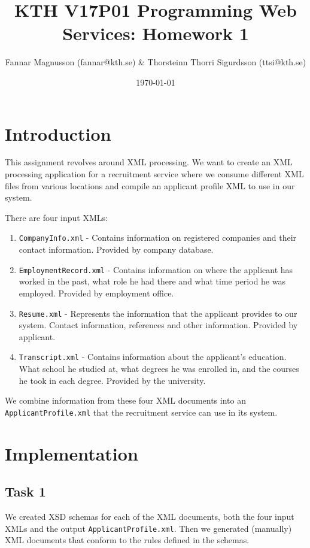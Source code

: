 \documentclass[a4paper, 11pt]{article}
\title{KTH V17P01 Programming Web Services: Homework 1}
\author{Fannar Magnusson (fannar@kth.se) & Thorsteinn Thorri Sigurdsson (ttsi@kth.se)}
\date{\today{}}
\begin{document}
\maketitle

\section{Introduction}

This assignment revolves around XML processing. We want to create an XML processing application for a recruitment service where we consume different XML files from various locations and compile an applicant profile XML to use in our system. 

There are four input XMLs:

\begin{enumerate}
    \item \texttt{CompanyInfo.xml} - Contains information on registered companies and their contact information. Provided by company database.
    \item \texttt{EmploymentRecord.xml} - Contains information on where the applicant has worked in the past, what role he had there and what time period he was employed. Provided by employment office.
    \item \texttt{Resume.xml} - Represents the information that the applicant provides to our system. Contact information, references and other information. Provided by applicant.
    \item \texttt{Transcript.xml} - Contains information about the applicant's education. What school he studied at, what degrees he was enrolled in, and the courses he took in each degree. Provided by the university.
\end{enumerate}

We combine information from these four XML documents into an \texttt{ApplicantProfile.xml} that the recruitment service can use in its system.

\section{Implementation}

\subsection{Task 1}

We created XSD schemas for each of the XML documents, both the four input XMLs and the output \texttt{ApplicantProfile.xml}. Then we generated (manually) XML documents that conform to the rules defined in the schemas.
\end{document}
